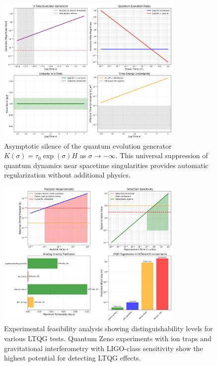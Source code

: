 \documentclass[12pt,a4paper]{article}
\begin{document}
\begin{figure}[H]
\centering
\includegraphics[width=0.8\textwidth]{figs/effective_generator_silence.png}
\caption{Asymptotic silence of the quantum evolution generator $K(\sigma) = \tau_0 \exp(\sigma) H$ as $\sigma \to -\infty$. This universal suppression of quantum dynamics near spacetime singularities provides automatic regularization without additional physics.}
\label{fig:generator_silence}
\end{figure}

\begin{figure}[H]
\centering
\includegraphics[width=0.8\textwidth]{figs/experimental_feasibility.png}
\caption{Experimental feasibility analysis showing distinguishability levels for various LTQG tests. Quantum Zeno experiments with ion traps and gravitational interferometry with LIGO-class sensitivity show the highest potential for detecting LTQG effects.}
\label{fig:experimental_feasibility}
\end{figure}
\end{document}

